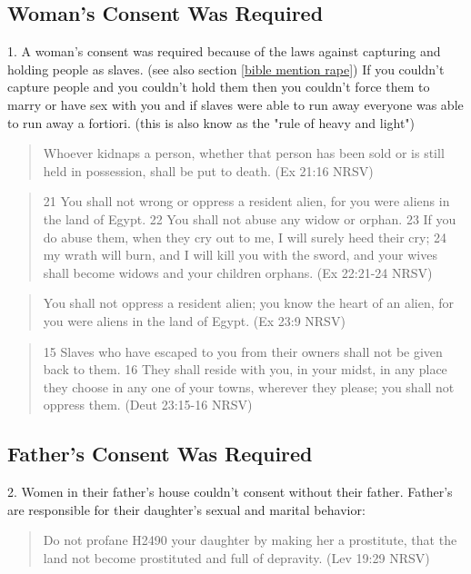 \documentclass[11pt]{article}
\begin{document}
\subsection{Woman's Consent Was Required}

1. A woman’s consent was required because of the laws against capturing and holding people as slaves. (see also section \ref{bible mention rape}) If you couldn't capture people and you couldn't hold them then you couldn't force them to marry or have sex with you and if slaves were able to run away everyone was able to run away a fortiori. (this is also know as the "rule of heavy and light")
\begin{quote}
 Whoever kidnaps a person, whether that person has been sold or is still held in possession, shall be put to death. (Ex 21:16 NRSV)
\end{quote}
\begin{quote}
21 You shall not wrong or oppress a resident alien, for you were aliens in the land of Egypt. 22 You shall not abuse any widow or orphan. 23 If you do abuse them, when they cry out to me, I will surely heed their cry; 24 my wrath will burn, and I will kill you with the sword, and your wives shall become widows and your children orphans. (Ex 22:21-24 NRSV)
\end{quote}
\begin{quote}
You shall not oppress a resident alien; you know the heart of an alien, for you were aliens in the land of Egypt. (Ex 23:9 NRSV)
\end{quote}
\begin{quote}
15 Slaves who have escaped to you from their owners shall not be given back to them. 16 They shall reside with you, in your midst, in any place they choose in any one of your towns, wherever they please; you shall not oppress them. (Deut 23:15-16 NRSV)
\end{quote}

\subsection{Father's Consent Was Required}

2. Women in their father’s house couldn't consent without their father. Father’s are responsible for their daughter’s sexual and marital behavior:
\begin{quote}
Do not profane H2490 your daughter by making her a prostitute, that the land not become prostituted and full of depravity. (Lev 19:29 NRSV)
\end{quote}
\end{document}
